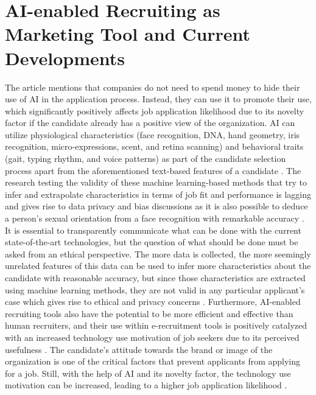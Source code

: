 \documentclass[draft,final]{thesisclass} %
\begin{document}
\section{\acs{AI}-enabled Recruiting as Marketing Tool and Current Developments}
The article \textcite[215]{marketing_ai_recruitment} mentions that companies do not need to spend money to hide their use of \acs{AI} in the application process. Instead, they can use it to promote their use, which significantly positively affects job application likelihood due to its novelty factor if the candidate already has a positive view of the organization.
\acs{AI} can utilize physiological characteristics (face recognition, DNA, hand geometry, iris recognition, micro-expressions, scent, and retina scanning) and behavioral traits (gait, typing rhythm, and voice patterns) as part of the candidate selection process apart from the aforementioned text-based features of a candidate \parencite[215]{marketing_ai_recruitment}.
The research testing the validity of these machine learning-based methods that try to infer and extrapolate characteristics in terms of job fit and performance is lagging and gives rise to data privacy and bias discussions as it is also possible to deduce a person's sexual orientation from a face recognition with remarkable accuracy \parencite[215]{marketing_ai_recruitment}.
It is essential to transparently communicate what can be done with the current state-of-the-art technologies, but the question of what should be done must be asked from an ethical perspective.
The more data is collected, the more seemingly unrelated features of this data can be used to infer more characteristics about the candidate with reasonable accuracy, but since those characteristics are extracted using machine learning methods, they are not valid in any particular applicant's case which gives rise to ethical and privacy concerns \parencite[215]{marketing_ai_recruitment}.
Furthermore, \acs{AI}-enabled recruiting tools also have the potential to be more efficient and effective than human recruiters, and their use within e-recruitment tools is positively catalyzed with an increased technology use motivation of job seekers due to its perceived usefulness \parencite[216]{marketing_ai_recruitment}.
The candidate's attitude towards the brand or image of the organization is one of the critical factors that prevent applicants from applying for a job. Still, with the help of \acs{AI} and its novelty factor, the technology use motivation can be increased, leading to a higher job application likelihood \parencite[217]{marketing_ai_recruitment}.
\end{document}
